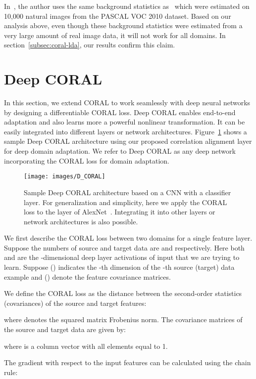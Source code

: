 \documentclass[graybox]{svmult}
\begin{document}
In~\cite{ICRA14}, the author uses the same background statistics as~\cite{who} which were estimated on 10,000 natural images from the PASCAL VOC 2010 dataset. Based on our analysis above, even though these background statistics were estimated from a very large amount of real image data, it will not work for all domains. In section~\ref{subsec:coral-lda}, our results confirm this claim. \section{Deep CORAL}
\label{sec:dcoral}
In this section, we extend CORAL to work seamlessly with deep neural networks by designing a differentiable CORAL loss. Deep CORAL enables end-to-end adaptation and also learns more a powerful nonlinear transformation. It can be easily integrated into different layers or network architectures. Figure~\ref{fig:d-coral} shows a sample Deep CORAL architecture using our proposed correlation alignment layer for deep domain adaptation. We refer to Deep CORAL as any deep network incorporating the CORAL loss for domain adaptation. 

\begin{figure}[t]
\centering
\texttt{[image: images/D\_CORAL]}
\caption{\small Sample Deep CORAL architecture based on a CNN with a classifier layer. For generalization and simplicity, here we apply the CORAL loss to the  layer of AlexNet~\cite{alexnet}. Integrating it into other layers or network architectures is also possible.}
\label{fig:d-coral}
\end{figure}

We first describe the CORAL loss between two domains for a single feature layer. Suppose the numbers of source and target data are  and  respectively. Here both  and  are the -dimensional deep layer activations  of input  that we are trying to learn. Suppose  () indicates the -th dimension of the -th source (target) data example and  () denote the feature covariance matrices. 

We define the CORAL loss as the distance between the second-order statistics (covariances) of the source and target features:
      
where  denotes the squared matrix Frobenius norm. 
The covariance matrices of the source and target data are given by:
      
      
where  is a column vector with all elements equal to 1. 

The gradient with respect to the input features can be calculated using the chain rule:
      
\end{document}
